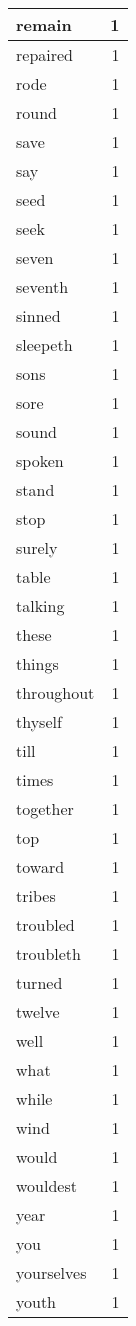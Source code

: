 \begin{center}
\begin{longtable}{l|r}
remain & 1 \\ \hline
repaired & 1 \\ \hline
rode & 1 \\ \hline
round & 1 \\ \hline
save & 1 \\ \hline
say & 1 \\ \hline
seed & 1 \\ \hline
seek & 1 \\ \hline
seven & 1 \\ \hline
seventh & 1 \\ \hline
sinned & 1 \\ \hline
sleepeth & 1 \\ \hline
sons & 1 \\ \hline
sore & 1 \\ \hline
sound & 1 \\ \hline
spoken & 1 \\ \hline
stand & 1 \\ \hline
stop & 1 \\ \hline
surely & 1 \\ \hline
table & 1 \\ \hline
talking & 1 \\ \hline
these & 1 \\ \hline
things & 1 \\ \hline
throughout & 1 \\ \hline
thyself & 1 \\ \hline
till & 1 \\ \hline
times & 1 \\ \hline
together & 1 \\ \hline
top & 1 \\ \hline
toward & 1 \\ \hline
tribes & 1 \\ \hline
troubled & 1 \\ \hline
troubleth & 1 \\ \hline
turned & 1 \\ \hline
twelve & 1 \\ \hline
well & 1 \\ \hline
what & 1 \\ \hline
while & 1 \\ \hline
wind & 1 \\ \hline
would & 1 \\ \hline
wouldest & 1 \\ \hline
year & 1 \\ \hline
you & 1 \\ \hline
yourselves & 1 \\ \hline
youth & 1 \\ \hline
\end{longtable}
\end{center}



